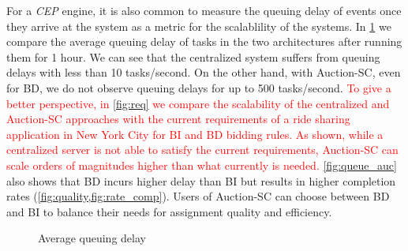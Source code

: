 For a \emph{CEP} engine, it is also common to measure the queuing delay of events \cite{Wu06} once they arrive at the system as a metric for the scalablility of the systems. In \cref{fig:queue} we compare the average queuing delay of tasks in the two architectures after running them for 1 hour. We can see that the centralized system suffers from queuing delays with less than 10 tasks/second. On the other hand, with Auction-SC, even for BD, we do not observe queuing delays for up to 500 tasks/second. \textcolor{red}{To give a better perspective, in \cref{fig:req} we compare the scalability of the centralized and Auction-SC approaches with the current requirements of a ride sharing application in New York City \cite{NYCTaxi} for BI and BD bidding rules. As shown, while a centralized server is not able to satisfy the current requirements, Auction-SC can scale orders of magnitudes higher than what currently is needed.} \cref{fig:queue_auc} also shows that BD incurs higher delay than BI but results in higher completion rates (\cref{fig:quality,fig:rate_comp}). Users of Auction-SC can choose between BD and BI to balance their needs for assignment quality and efficiency.

\begin{figure}[h]
    \centering
    \vspace{-0.15in}
    \caption{Average queuing delay}
    \label{fig:queue}
\end{figure}

